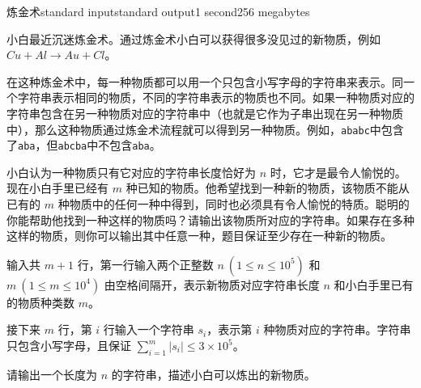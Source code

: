 \begin{problem}{炼金术}{standard input}{standard output}{1 second}{256 megabytes}

    小白最近沉迷炼金术。通过炼金术小白可以获得很多没见过的新物质，例如 $Cu+Al\to Au+Cl$。

    在这种炼金术中，每一种物质都可以用一个只包含小写字母的字符串来表示。同一个字符串表示相同的物质，不同的字符串表示的物质也不同。如果一种物质对应的字符串包含在另一种物质对应的字符串中（也就是它作为子串出现在另一种物质中），那么这种物质通过炼金术流程就可以得到另一种物质。例如，\texttt{ababc}中包含了\texttt{aba}，但\texttt{abcba}中不包含\texttt{aba}。

    小白认为一种物质只有它对应的字符串长度恰好为 $n$ 时，它才是最令人愉悦的。现在小白手里已经有 $m$ 种已知的物质。他希望找到一种新的物质，该物质不能从已有的 $m$ 种物质中的任何一种中得到，同时也必须具有令人愉悦的特质。聪明的你能帮助他找到一种这样的物质吗？请输出该物质所对应的字符串。如果存在多种这样的物质，则你可以输出其中任意一种，题目保证至少存在一种新的物质。

    \InputFile
    
    输入共 $m+1$ 行，第一行输入两个正整数 $n\ (1\le n\le 10^5)$ 和 $m\ (1\le m\le 10^4)$ 由空格间隔开，表示新物质对应字符串长度 $n$ 和小白手里已有的物质种类数 $m$。

    接下来 $m$ 行，第 $i$ 行输入一个字符串 $s_i$，表示第 $i$ 种物质对应的字符串。字符串只包含小写字母，且保证 $\sum\limits_{i=1}^m |s_i| \le 3\times 10^5$。

    \OutputFile
    
    请输出一个长度为 $n$ 的字符串，描述小白可以炼出的新物质。

    \Example
    
    \begin{example}
    \end{example}

\end{problem}